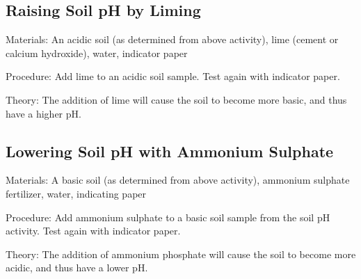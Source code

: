 \begin{multicols}{2}
\subsection{Raising Soil pH by Liming}


\begin{description*}
\item[Materials:]{An acidic soil (as determined from above activity), lime (cement or calcium hydroxide), water, indicator paper}
\item[Procedure:]{Add lime to an acidic soil sample. Test again with indicator paper.}
\item[Theory:]{The addition of lime will cause the soil to become more basic, and thus have a higher pH.}
\end{description*}

\subsection{Lowering Soil pH with Ammonium Sulphate}


\begin{description*}
\item[Materials:]{A basic soil (as determined from above activity), ammonium sulphate fertilizer, water,  indicating paper}
\item[Procedure:]{Add ammonium sulphate to a basic soil sample from the soil pH activity. Test again with indicator paper.}
\item[Theory:]{The addition of ammonium phosphate will cause the soil to become more acidic, and thus have a lower pH.}
\end{description*}


\end{multicols}

\pagebreak